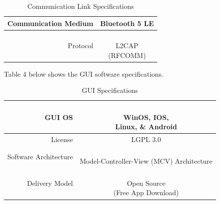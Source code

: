 \documentclass[12pt]{article}
\begin{document}
\begin{table}[h!]
\centering
\caption{Communication Link Specifications}
\begin{tabular} {| r | c | }
\hline
\parbox{0.275\linewidth}{\raggedleft Communication Medium \\[0.4em]} &  \parbox{0.24\linewidth}{\centering Bluetooth 5 LE}\\
\hline
\parbox{0.275\linewidth}{\raggedleft Protocol} &  \parbox{0.24\linewidth}{\centering \hfill\\[0.1em] L2CAP \\ (RFCOMM)\\[0.5em]}\\
\hline
\end{tabular}
\end{table}

\indent
 Table 4 below shows the GUI software specifications.
 \hfill

\begin{table}[h!]
\centering
\caption{GUI Specifications}
\begin{tabular} {| r | c | }
\hline
\parbox{0.275\linewidth}{\raggedleft GUI OS} & \parbox{0.24\linewidth}{\centering \hfill \\ WinOS, IOS, \\ Linux, \& Android}\\[0.4em]
\hline
\parbox{0.275\linewidth}{\raggedleft License} &    \parbox{0.24\linewidth}{\centering LGPL 3.0} \\
\hline
\parbox{0.275\linewidth}{\raggedleft Software Architecture} &   \parbox{0.24\linewidth}{\centering \hfill \\ Model-Controller-View (MCV) Architecture\\[0.4em]} \\
\hline
\parbox{0.275\linewidth}{\raggedleft Delivery Model} &   \parbox{0.24\linewidth}{\centering \hfill \\ Open Source \\ (Free App Download)} \\[0.4em]
\hline
\end{tabular}
\end{table}

\pagebreak
\end{document}
